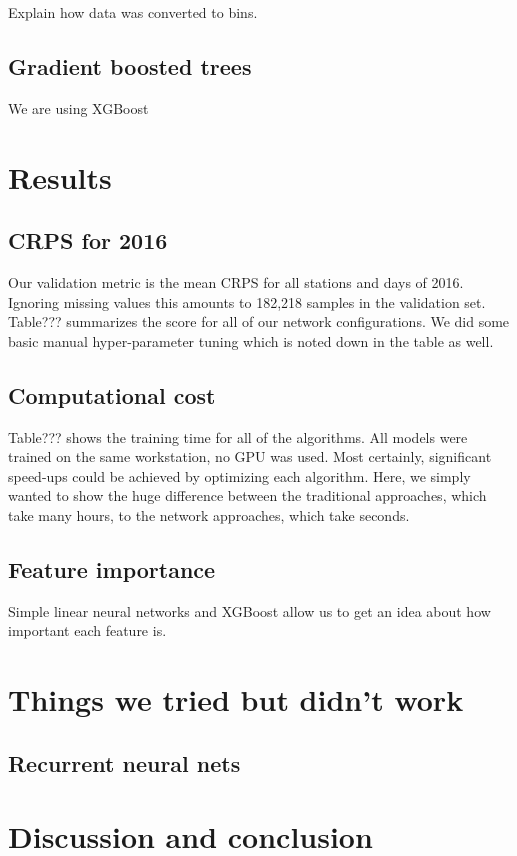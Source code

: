 \documentclass[a4paper,10pt]{scrartcl}
\begin{document}
Explain how data was converted to bins.

\subsection{Gradient boosted trees}

We are using XGBoost



\section{Results}
\label{sec:results}

\subsection{CRPS for 2016}
Our validation metric is the mean CRPS for all stations and days of 2016. Ignoring missing values this amounts to 182,218 samples in the validation set. Table??? summarizes the score for all of our network configurations. We did some basic manual hyper-parameter tuning which is noted down in the table as well. 

\subsection{Computational cost}
Table??? shows the training time for all of the algorithms. All models were trained on the same workstation, no GPU was used. Most certainly, significant speed-ups could be achieved by optimizing each algorithm. Here, we simply wanted to show the huge difference between the traditional approaches, which take many hours, to the network approaches, which take seconds. 

\subsection{Feature importance}
Simple linear neural networks and XGBoost allow us to get an idea about how important each feature is.

\section{Things we tried but didn't work}

\subsection{Recurrent neural nets}


\section{Discussion and conclusion}



\end{document}
